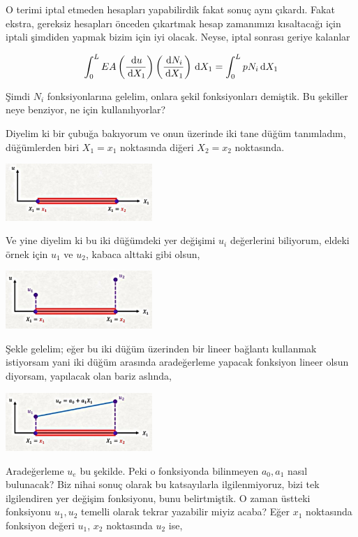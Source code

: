 \documentclass[12pt,fleqn]{article}\usepackage{../../common}
\begin{document}
O terimi iptal etmeden hesapları yapabilirdik fakat sonuç aynı çıkardı. Fakat
ekstra, gereksiz hesapları önceden çıkartmak hesap zamanımızı kısaltacağı için
iptali şimdiden yapmak bizim için iyi olacak. Neyse, iptal sonrası geriye
kalanlar

$$
\int_{0}^{L} EA
\left( \frac{\,\mathrm{d} u}{\,\mathrm{d} X_1} \right)
\left( \frac{\,\mathrm{d} N_i}{\,\mathrm{d} X_1} \right) \,\mathrm{d} X_1
= \int_{0}^{L} p N_i \,\mathrm{d} X_1 
$$

Şimdi $N_i$ fonksiyonlarına gelelim, onlara şekil fonksiyonları demiştik.
Bu şekiller neye benziyor, ne için kullanılıyorlar?

Diyelim ki bir çubuğa bakıyorum ve onun üzerinde iki tane düğüm tanımladım,
düğümlerden biri $X_1 = x_1$ noktasında diğeri $X_2 = x_2$ noktasında.

\includegraphics[width=15em]{compscieng_bpp45fem2_05.jpg}

Ve yine diyelim ki bu iki düğümdeki yer değişimi $u_i$ değerlerini biliyorum,
eldeki örnek için $u_1$ ve $u_2$, kabaca alttaki gibi olsun,

\includegraphics[width=15em]{compscieng_bpp45fem2_06.jpg}

Şekle gelelim; eğer bu iki düğüm üzerinden bir lineer bağlantı kullanmak
istiyorsam yani iki düğüm arasında aradeğerleme yapacak fonksiyon lineer olsun
diyorsam, yapılacak olan bariz aslında,

\includegraphics[width=15em]{compscieng_bpp45fem2_07.jpg}

Aradeğerleme $u_e$ bu şekilde. Peki o fonksiyonda bilinmeyen $a_0,a_1$ nasıl
bulunacak? Biz nihai sonuç olarak bu katsayılarla ilgilenmiyoruz, bizi tek
ilgilendiren yer değişim fonksiyonu, bunu belirtmiştik. O zaman üstteki
fonksiyonu $u_1,u_2$ temelli olarak tekrar yazabilir miyiz acaba? Eğer $x_1$
noktasında fonksiyon değeri $u_1$, $x_2$ noktasında $u_2$ ise,
\end{document}
